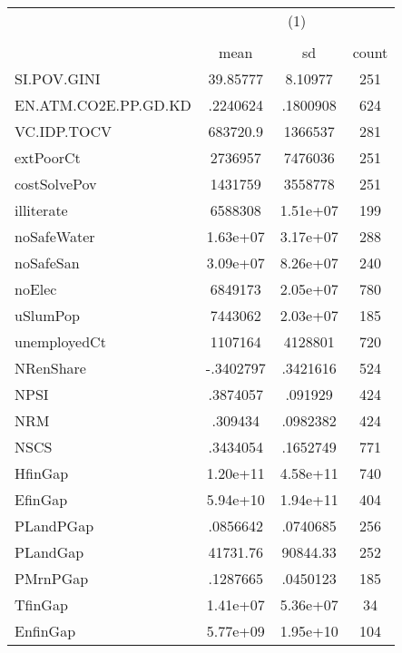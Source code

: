 {
\def\sym#1{\ifmmode^{#1}\else\(^{#1}\)\fi}
\begin{tabular}{l*{1}{ccc}}
\hline\hline
                    &\multicolumn{3}{c}{(1)}               \\
                    &\multicolumn{3}{c}{}                  \\
                    &        mean&          sd&       count\\
\hline
SI.POV.GINI         &    39.85777&     8.10977&         251\\
EN.ATM.CO2E.PP.GD.KD&    .2240624&    .1800908&         624\\
VC.IDP.TOCV         &    683720.9&     1366537&         281\\
extPoorCt           &     2736957&     7476036&         251\\
costSolvePov        &     1431759&     3558778&         251\\
illiterate          &     6588308&    1.51e+07&         199\\
noSafeWater         &    1.63e+07&    3.17e+07&         288\\
noSafeSan           &    3.09e+07&    8.26e+07&         240\\
noElec              &     6849173&    2.05e+07&         780\\
uSlumPop            &     7443062&    2.03e+07&         185\\
unemployedCt        &     1107164&     4128801&         720\\
NRenShare           &   -.3402797&    .3421616&         524\\
NPSI                &    .3874057&     .091929&         424\\
NRM                 &     .309434&    .0982382&         424\\
NSCS                &    .3434054&    .1652749&         771\\
HfinGap             &    1.20e+11&    4.58e+11&         740\\
EfinGap             &    5.94e+10&    1.94e+11&         404\\
PLandPGap           &    .0856642&    .0740685&         256\\
PLandGap            &    41731.76&    90844.33&         252\\
PMrnPGap            &    .1287665&    .0450123&         185\\
TfinGap             &    1.41e+07&    5.36e+07&          34\\
EnfinGap            &    5.77e+09&    1.95e+10&         104\\

\end{tabular}}
